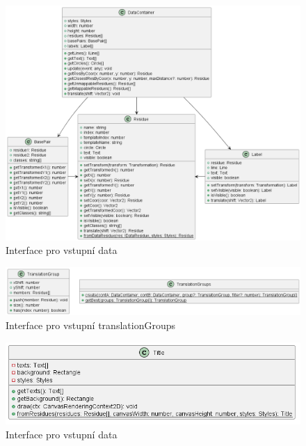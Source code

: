\begin{figure}[H]
  \centering
  \includegraphics[width=145mm]{../img/dataContainer.png}
  \caption{Interface pro vstupní data}
\end{figure}

\begin{figure}[H]
  \centering
  \includegraphics[width=145mm]{../img/translationGroups.png}
  \caption{Interface pro vstupní translationGroups}
\end{figure}

\begin{figure}[H]
  \centering
  \includegraphics[width=145mm]{../img/title.png}
  \caption{Interface pro vstupní data}
\end{figure}

